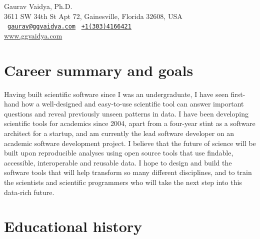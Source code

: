 \documentclass[12pt,letter]{article}
\begin{document}
\thispagestyle{plain}

\begin{center}

{\selectfont
\large Gaurav Vaidya, Ph.D. \\
\small
3611 SW 34th St Apt 72, Gainesville, Florida 32608, USA \\
\Letter~{\tt \href{mailto:gaurav@ggvaidya.com}{gaurav@ggvaidya.com}}
\hspace{0.25em}
\Telefon~{\tt \href{tel:+13034166421}{+1\hspace{0.3em}(303)\hspace{0.3em}416\hspace{0.3em}6421}\hspace{0.3em}} \\
\url{www.ggvaidya.com}
}

\vspace{-1em}

\end{center}

\normalfont

\selectfont

\part{Career summary and goals}

Having built scientific software since I was an undergraduate, I have seen first-hand how a well-designed and easy-to-use scientific tool can answer important questions and reveal previously unseen patterns in data. I have been developing scientific tools for academics since 2004, apart from a four-year stint as a software architect for a startup, and am currently the lead software developer on an academic software development project. I believe that the future of science will be built upon reproducible analyses using open source tools that use findable, accessible, interoperable and reusable data. I hope to design and build the  software tools that will help transform so many different disciplines, and to train the scientists and scientific programmers who will take the next step into this data-rich future.


\part{Educational history}

\end{document}

